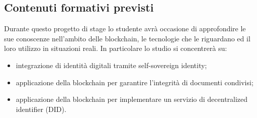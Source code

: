 \subsection{Contenuti formativi previsti}
	Durante questo progetto di stage lo studente avrà occasione di approfondire le sue conoscenze nell'ambito delle blockchain, le tecnologie che le riguardano ed il loro utilizzo in situazioni reali.
	\newline
	In particolare lo studio si concentrerà su:
	\begin{itemize}
		\item integrazione di identità digitali tramite self-sovereign identity;
		\item applicazione della blockchain per garantire l'integrità di documenti condivisi;
		\item applicazione della blockchain per implementare un servizio di decentralized identifier (DID).
	\end{itemize}
